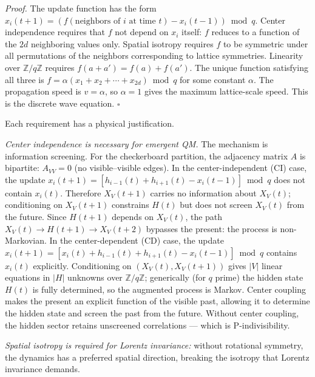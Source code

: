 \documentclass[
  11pt,
]{article}
\begin{document}
\emph{Proof.} The update function has the form
\(x_i(t+1) = (f(\text{neighbors of } i \text{ at time } t) - x_i(t-1)) \bmod q\).
Center independence requires that \(f\) not depend on \(x_i\) itself:
\(f\) reduces to a function of the \(2d\) neighboring values only.
Spatial isotropy requires \(f\) to be symmetric under all permutations
of the neighbors corresponding to lattice symmetries. Linearity over
\(\mathbb{Z}/q\mathbb{Z}\) requires \(f(a + a') = f(a) + f(a')\). The
unique function satisfying all three is
\(f = \alpha(x_1 + x_2 + \cdots + x_{2d}) \bmod q\) for some constant
\(\alpha\). The propagation speed is \(v = \alpha\), so \(\alpha = 1\)
gives the maximum lattice-scale speed. This is the discrete wave
equation. \(\square\)

Each requirement has a physical justification.

\emph{Center independence is necessary for emergent QM.} The mechanism
is information screening. For the checkerboard partition, the adjacency
matrix \(A\) is bipartite: \(A_{VV} = 0\) (no visible--visible edges).
In the center-independent (CI) case, the update
\(x_i(t+1) = [h_{i-1}(t) + h_{i+1}(t) - x_i(t-1)] \bmod q\) does not
contain \(x_i(t)\). Therefore \(X_V(t+1)\) carries no information about
\(X_V(t)\); conditioning on \(X_V(t+1)\) constrains \(H(t)\) but does
not screen \(X_V(t)\) from the future. Since \(H(t+1)\) depends on
\(X_V(t)\), the path \(X_V(t) \to H(t+1) \to X_V(t+2)\) bypasses the
present: the process is non-Markovian. In the center-dependent (CD)
case, the update
\(x_i(t+1) = [x_i(t) + h_{i-1}(t) + h_{i+1}(t) - x_i(t-1)] \bmod q\)
contains \(x_i(t)\) explicitly. Conditioning on \((X_V(t), X_V(t+1))\)
gives \(|V|\) linear equations in \(|H|\) unknowns over
\(\mathbb{Z}/q\mathbb{Z}\); generically (for \(q\) prime) the hidden
state \(H(t)\) is fully determined, so the augmented process is Markov.
Center coupling makes the present an explicit function of the visible
past, allowing it to determine the hidden state and screen the past from
the future. Without center coupling, the hidden sector retains
unscreened correlations --- which is P-indivisibility.

\emph{Spatial isotropy is required for Lorentz invariance:} without
rotational symmetry, the dynamics has a preferred spatial direction,
breaking the isotropy that Lorentz invariance demands.
\end{document}
